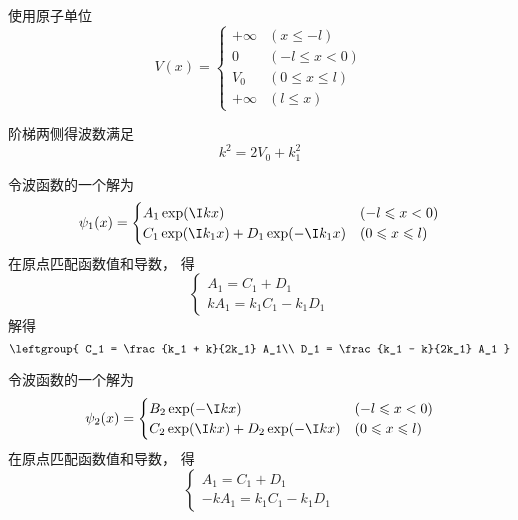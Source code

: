 
\begin{issues}
\issueDraft
\end{issues}


使用原子单位
\begin{equation}
V(x) =
\begin{cases}
+\infty  & (x \leqslant -l)\\
0  & (-l \leqslant x < 0)\\
V_0  & (0 \leqslant x \leqslant l)\\
+\infty  & (l \leqslant x)
\end{cases}
\end{equation}

阶梯两侧得波数满足
\begin{equation}
k^2 = 2V_0 + k_1^2
\end{equation}

令波函数的一个解为
\begin{equation}
\psi_1(x) =
\begin{cases}
A_1 \exp(\I k x)  & (-l \leqslant x < 0)\\
C_1 \exp(\I k_1 x) + D_1 \exp(-\I k_1 x) & (0 \leqslant x \leqslant l)
\end{cases}
\end{equation}
在原点匹配函数值和导数， 得
\begin{equation}
\begin{cases}
A_1 = C_1 + D_1\\
kA_1 = k_1 C_1 - k_1 D_1
\end{cases}
\end{equation}
解得
\begin{equation}
\leftgroup{
    C_1 = \frac{k_1 + k}{2k_1} A_1\\
    D_1 = \frac{k_1 - k}{2k_1} A_1
}
\end{equation}

令波函数的一个解为
\begin{equation}
\psi_2(x) =
\begin{cases}
B_2 \exp(-\I k x)  & (-l \leqslant x < 0)\\
C_2 \exp(\I k x) + D_2 \exp(-\I k x) & (0 \leqslant x \leqslant l)
\end{cases}
\end{equation}
在原点匹配函数值和导数， 得
\begin{equation}
\begin{cases}
A_1 = C_1 + D_1\\
-kA_1 = k_1 C_1 - k_1 D_1
\end{cases}
\end{equation}
